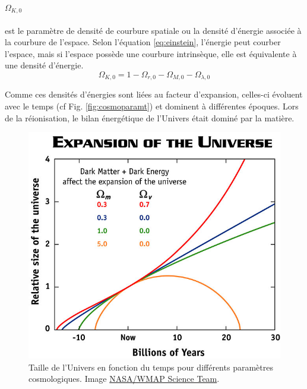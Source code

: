\paragraph{$\Omega_{K,0}$} est le paramètre de densité de courbure spatiale ou la densité d'énergie associée à la courbure de l'espace.
Selon l’équation \ref{eq:einstein}, l'énergie peut courber l'espace, mais si l'espace possède une courbure intrinsèque, elle est équivalente à une densité d'énergie.
\begin{equation}
\Omega_{K,0} = 1 - \Omega_{r,0} - \Omega_{M,0} - \Omega_{\lambda,0} 
\end{equation}

Comme ces densités d'énergies sont liées au facteur d'expansion, celles-ci évoluent avec le temps (cf Fig. \ref{fig:cosmoparamt}) et dominent à différentes époques.
Lors de la réionisation, le bilan énergétique de l'Univers était dominé par la matière.

\begin{figure}
        \includegraphics[width=.9\linewidth]{img/01/scale_t.jpg} 
        \caption[Taille de l'Univers]{Taille de l'Univers en fonction du temps pour différents paramètres cosmologiques.
		Image \href{https://map.gsfc.nasa.gov/universe/bb_concepts_exp.html}{NASA/WMAP Science Team}.
 		\label{fig:scale_t}}
\end{figure}

